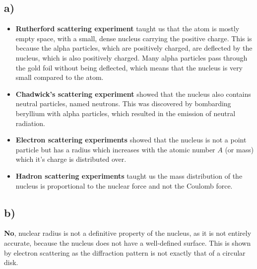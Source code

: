 \documentclass{article}
\begin{document}
\subsection*{a)}
\begin{itemize}
    \item \textbf{Rutherford scattering experiment} taught us that the atom is mostly empty space, with a small, dense nucleus carrying the positive charge. This is because the alpha particles, which are positively charged, are deflected by the nucleus, which is also positively charged. Many alpha particles pass through the gold foil without being deflected, which means that the nucleus is very small compared to the atom.
    \item \textbf{Chadwick's scattering experiment} showed that the nucleus also contains neutral particles, named neutrons. This was discovered by bombarding beryllium with alpha particles, which resulted in the emission of neutral radiation.
    \item \textbf{Electron scattering experiments} showed that the nucleus is not a point particle but has a radius which increases with the atomic number $A$ (or mass) which it's charge is distributed over.
    \item \textbf{Hadron scattering experiments} taught us the mass distribution of the nucleus is proportional to the nuclear force and not the Coulomb force.
\end{itemize}


\subsection*{b)}
\textbf{No}, nuclear radius is not a definitive property of the nucleus, as it is not entirely accurate, because the nucleus does not have a well-defined surface. This is shown by electron scattering as the diffraction pattern is not exactly that of a circular disk.
\end{document}
